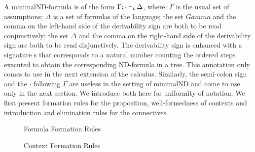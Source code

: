 \documentclass[]{article}
\newcommand{\Turn}[2]
	{ {#1}\vdash_{\textbf{\sf s}}  {#2}}
\newcommand{\TurnNext}[2]
	{ {#1}\vdash_{\textbf{\sf s+1}}  {#2}}
\begin{document}
%
A {\sf minimalND}-formula is of the form $\Gamma;\cdot \vdash_{\sf s} \Delta$, where: $\Gamma$ is the usual set of assumptions; $\Delta$ is a set of formulas of the language; the set $Gamma$ and the comma on the left-hand side of the derivability sign are both to be read conjunctively; the set $\Delta$ and the comma on the right-hand side of the derivability sign are both to be read disjunctively. The derivability sign is enhanced with a signature {\sf s} that corresponds to a natural number counting the ordered steps executed to obtain the corresponding ND-formula in a tree. This annotation only comes to use in the next extension of the calculus. Similarly, the semi-colon sign and the $\cdot$ following $\Gamma$ are useless in the setting of {\sf minimalND} and come to use only in the next section. We introduce both here for uniformity of notation. We first present formation rules for the proposition, well-formedness of contexts and introduction and elimination rules for the connectives. 


\begin{figure}[h!]
\caption{Formula Formation Rules}
\end{figure}




\begin{figure}[h!]


\caption{Context Formation Rules}
\end{figure}
\end{document}
